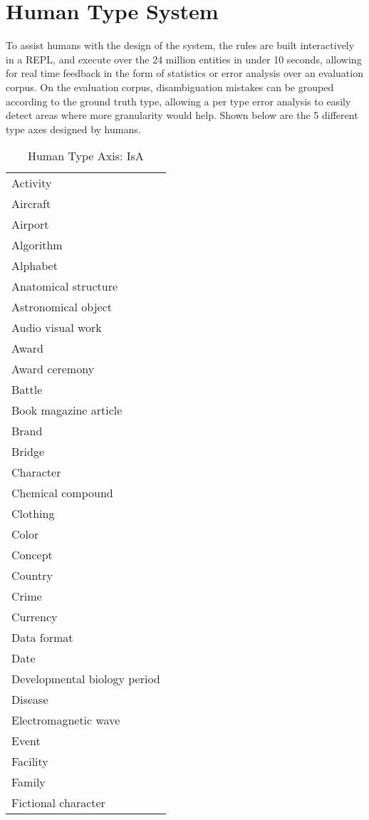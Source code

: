 \documentclass[letterpaper]{article}
\begin{document}
\section{Human Type System}
\label{section:humandepth}
To assist humans with the design of the system, the rules are built interactively in a REPL, and execute over the 24 million entities in under 10 seconds, allowing for real time feedback in the form of statistics or error analysis over an evaluation corpus. On the evaluation corpus, disambiguation mistakes can be grouped according to the ground truth type, allowing a per type error analysis to easily detect areas where more granularity would help.
Shown below are the 5 different type axes designed by humans.
\begin{table*}[ht]
\caption{Human Type Axis: IsA}
\begin{center}
\begin{tabular}{|l|}\hline
Activity\\
Aircraft\\
Airport\\
Algorithm\\
Alphabet\\
Anatomical structure\\
Astronomical object\\
Audio visual work\\
Award\\
Award ceremony\\
Battle\\
Book magazine article\\
Brand\\
Bridge\\
Character\\
Chemical compound\\
Clothing\\
Color\\
Concept\\
Country\\
Crime\\
Currency\\
Data format\\
Date\\
Developmental biology period\\
Disease\\
Electromagnetic wave\\
Event\\
Facility\\
Family\\
Fictional character\\

\end{tabular}
\end{center}
\end{table*}
\end{document}

